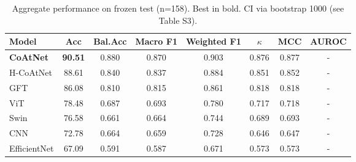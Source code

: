 \begin{table}[t]
\caption{Aggregate performance on frozen test (n=158). Best in bold. CI via bootstrap 1000 (see Table S3).}
\label{tab:aggregate}
\centering\small\begin{tabular}{lccccccc}
\toprule Model & Acc & Bal.Acc & Macro F1 & Weighted F1 & $\kappa$ & MCC & AUROC \\
\midrule
\textbf{CoAtNet} & \textbf{90.51} & 0.880 & 0.870 & 0.903 & 0.876 & 0.877 & - \\
H-CoAtNet & 88.61 & 0.840 & 0.837 & 0.884 & 0.851 & 0.852 & - \\
GFT & 86.08 & 0.810 & 0.815 & 0.861 & 0.818 & 0.818 & - \\
ViT & 78.48 & 0.687 & 0.693 & 0.780 & 0.717 & 0.718 & - \\
Swin & 76.58 & 0.661 & 0.664 & 0.744 & 0.689 & 0.693 & - \\
CNN & 72.78 & 0.664 & 0.659 & 0.728 & 0.646 & 0.647 & - \\
EfficientNet & 67.09 & 0.591 & 0.587 & 0.671 & 0.573 & 0.573 & - \\
\bottomrule\end{tabular}\end{table}